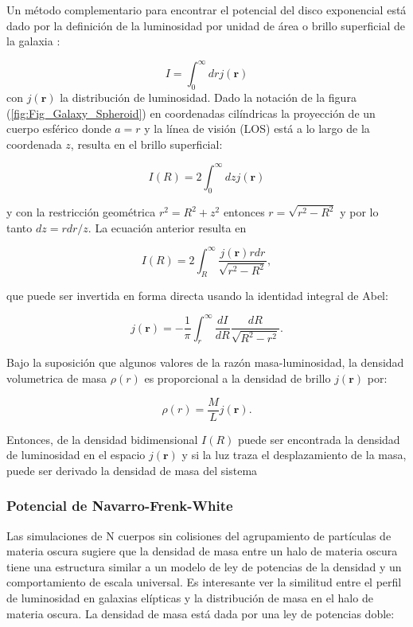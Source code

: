 Un método complementario para encontrar el potencial del disco exponencial está dado por la definición de la luminosidad por unidad de área o brillo superficial de la galaxia \cite{BT}:

$$ I = \int_0^{\infty} dr j(\textbf{r}) $$
con $ j(\textbf{r}) $ la distribución de luminosidad. Dado la notación de la figura (\ref{fig:Fig_Galaxy_Spheroid}) en coordenadas cilíndricas la proyección de un cuerpo esférico donde $ a=r $ y la línea de visión (LOS) está a lo largo de la coordenada  $z$, resulta en el brillo superficial:

$$ I(R) = 2\int_0^{\infty} dz j(\textbf{r}) $$

y con la restricción geométrica  $ r^2 = R^2 + z^2 $ entonces $ r = \sqrt{r^2-R^2} $ y por lo tanto $dz = r dr / z$. La ecuación anterior resulta en 

$$ I(R) = 2 \int_R^{\infty} \frac{j(\textbf{r}) r dr}{\sqrt{r^2 - R^2}}, $$

que puede ser invertida en forma directa usando la identidad integral de Abel:

$$ j(\textbf{r}) = -\frac{1}{\pi} \int_r^{\infty} \frac{dI}{dR} \frac{dR}{\sqrt{R^2-r^2}}. $$

Bajo la suposición que algunos valores de la razón masa-luminosidad, la densidad volumetrica de masa $\rho(r)$ es proporcional a la densidad de brillo $j(\textbf{r}) $ por:

$$ \rho(r) = \frac{M}{L} j(\textbf{r}). $$

Entonces, de la densidad bidimensional $I(R)$ puede ser encontrada la densidad de luminosidad en el espacio $ j(\textbf{r}) $ y si la luz traza el desplazamiento de la masa, puede ser derivado la densidad de masa del sistema\\

\subsubsection{Potencial de Navarro-Frenk-White}

Las simulaciones de N cuerpos sin colisiones del agrupamiento de partículas de materia oscura sugiere que la densidad de masa entre un halo de materia oscura tiene una estructura similar a un modelo de ley de potencias de la densidad y un comportamiento de escala universal. Es interesante ver la similitud entre el perfil de luminosidad en galaxias elípticas  \cite{BT} y la distribución de masa en el halo de materia oscura. La densidad de masa está dada por una ley de potencias doble:

